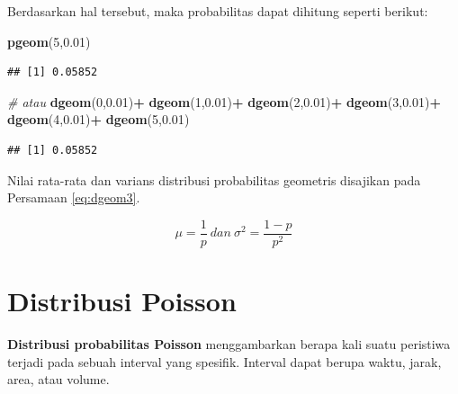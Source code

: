 \documentclass[]{book}
\newenvironment{Shaded}{\begin{snugshade}}{\end{snugshade}}
\newcommand{\KeywordTok}[1]{\textcolor[rgb]{0.13,0.29,0.53}{\textbf{#1}}}
\newcommand{\DecValTok}[1]{\textcolor[rgb]{0.00,0.00,0.81}{#1}}
\newcommand{\FloatTok}[1]{\textcolor[rgb]{0.00,0.00,0.81}{#1}}
\newcommand{\StringTok}[1]{\textcolor[rgb]{0.31,0.60,0.02}{#1}}
\newcommand{\CommentTok}[1]{\textcolor[rgb]{0.56,0.35,0.01}{\textit{#1}}}
\newcommand{\OperatorTok}[1]{\textcolor[rgb]{0.81,0.36,0.00}{\textbf{#1}}}
\newcommand{\NormalTok}[1]{#1}
\begin{document}
Berdasarkan hal tersebut, maka probabilitas dapat dihitung seperti
berikut:

\begin{Shaded}
\begin{Highlighting}[]
\KeywordTok{pgeom}\NormalTok{(}\DecValTok{5}\NormalTok{,}\FloatTok{0.01}\NormalTok{)}
\end{Highlighting}
\end{Shaded}

\begin{verbatim}
## [1] 0.05852
\end{verbatim}

\begin{Shaded}
\begin{Highlighting}[]
\CommentTok{# atau}
\KeywordTok{dgeom}\NormalTok{(}\DecValTok{0}\NormalTok{,}\FloatTok{0.01}\NormalTok{)}\OperatorTok{+}
\StringTok{  }\KeywordTok{dgeom}\NormalTok{(}\DecValTok{1}\NormalTok{,}\FloatTok{0.01}\NormalTok{)}\OperatorTok{+}
\StringTok{  }\KeywordTok{dgeom}\NormalTok{(}\DecValTok{2}\NormalTok{,}\FloatTok{0.01}\NormalTok{)}\OperatorTok{+}
\StringTok{  }\KeywordTok{dgeom}\NormalTok{(}\DecValTok{3}\NormalTok{,}\FloatTok{0.01}\NormalTok{)}\OperatorTok{+}
\StringTok{  }\KeywordTok{dgeom}\NormalTok{(}\DecValTok{4}\NormalTok{,}\FloatTok{0.01}\NormalTok{)}\OperatorTok{+}
\StringTok{  }\KeywordTok{dgeom}\NormalTok{(}\DecValTok{5}\NormalTok{,}\FloatTok{0.01}\NormalTok{)}
\end{Highlighting}
\end{Shaded}

\begin{verbatim}
## [1] 0.05852
\end{verbatim}

Nilai rata-rata dan varians distribusi probabilitas geometris disajikan
pada Persamaan \eqref{eq:dgeom3}.

\begin{equation}
   \mu=\frac{1}{p}\ dan\ \sigma^2=\frac{1-p}{p^2}
  \label{eq:dgeom3}
\end{equation}

\section{Distribusi Poisson}\label{distribusi-poisson}

\textbf{Distribusi probabilitas Poisson} menggambarkan berapa kali suatu
peristiwa terjadi pada sebuah interval yang spesifik. Interval dapat
berupa waktu, jarak, area, atau volume.
\end{document}
